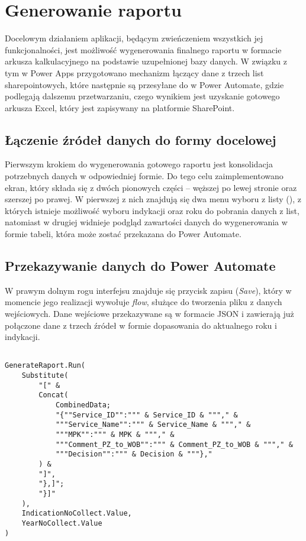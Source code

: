 \section{Generowanie raportu}

Docelowym działaniem aplikacji, będącym zwieńczeniem wszystkich jej funkcjonalności, jest możliwość wygenerowania finalnego raportu w formacie arkusza kalkulacyjnego na podstawie uzupełnionej bazy danych. W związku z tym w Power Apps przygotowano mechanizm łączący dane z trzech list sharepointowych, które następnie są przesyłane do w Power Automate, gdzie podlegają dalszemu przetwarzaniu, czego wynikiem jest uzyskanie gotowego arkusza Excel, który jest zapisywany na platformie SharePoint.

\subsection{Łączenie źródeł danych do formy docelowej}

Pierwszym krokiem do wygenerowania gotowego raportu jest konsolidacja potrzebnych danych w odpowiedniej formie. Do tego celu zaimplementowano ekran, który składa się z dwóch pionowych części -- węższej po lewej stronie oraz szerszej po prawej. W pierwszej z nich znajdują się dwa menu wyboru z listy (), z których istnieje możliwość wyboru indykacji oraz roku do pobrania danych z list, natomiast w drugiej widnieje podgląd zawartości danych do wygenerowania w formie tabeli, która może zostać przekazana do Power Automate.

\subsection{Przekazywanie danych do Power Automate}

W prawym dolnym rogu interfejsu znajduje się przycisk zapisu (\textit{Save}), który w momencie jego realizacji wywołuje \textit{flow}, służące do tworzenia pliku z danych wejściowych. Dane wejściowe przekazywane są w formacie JSON i zawierają już połączone dane z trzech źródeł w formie dopasowania do aktualnego roku i indykacji.



\begin{lstlisting}[language=PowerFx]

GenerateRaport.Run(
    Substitute(
        "[" & 
        Concat(
            CombinedData;
            "{""Service_ID"":""" & Service_ID & """," &
            """Service_Name"":""" & Service_Name & """," &
            """MPK"":""" & MPK & """," &
            """Comment_PZ_to_WOB"":""" & Comment_PZ_to_WOB & """," &
            """Decision"":""" & Decision & """},"
        ) & 
        "]",
        "},]"; 
        "}]"
    ),
    IndicationNoCollect.Value,
    YearNoCollect.Value
)

\end{lstlisting}
